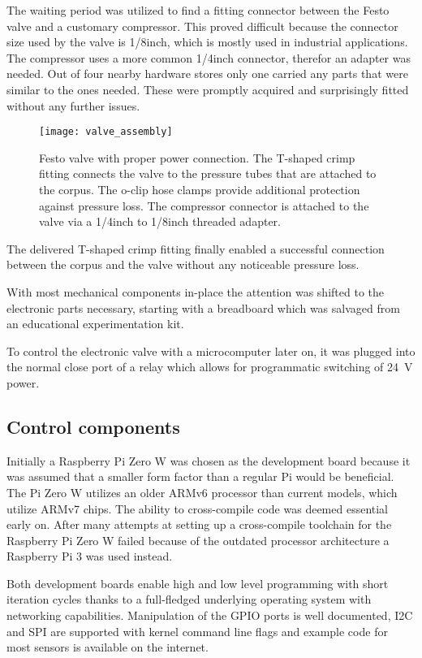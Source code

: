 The waiting period was utilized to find a fitting connector between the Festo valve and a customary compressor. This proved difficult because the connector size used by the valve is 1/8inch, which is mostly used in industrial applications. The compressor uses a more common 1/4inch connector, therefor an adapter was needed. Out of four nearby hardware stores only one carried any parts that were similar to the ones needed. These were promptly acquired and surprisingly fitted without any further issues.

\begin{figure}[h]
\centering

\texttt{[image: valve\_assembly]}

\caption{Festo valve with proper power connection. The T-shaped crimp fitting connects the valve to the pressure tubes that are attached to the corpus. The o-clip hose clamps provide additional protection against pressure loss. The compressor connector is attached to the valve via a 1/4inch to 1/8inch threaded adapter.}
\end{figure}

The delivered T-shaped crimp fitting finally enabled a successful connection between the corpus and the valve without any noticeable pressure loss.  

With most mechanical components in-place the attention was shifted to the electronic parts necessary, starting with a breadboard which was salvaged from an educational experimentation kit. 

To control the electronic valve with a microcomputer later on, it was plugged into the normal close port of a relay which allows for programmatic switching of \SI{24}{\volt} power. 

\subsection{Control components}
Initially a Raspberry Pi Zero W \cite{raspberry-pi-zero-w} was chosen as the development board because it was assumed that a smaller form factor than a regular Pi would be beneficial. 
The Pi Zero W utilizes an older ARMv6 processor than current models, which utilize ARMv7 chips. 
The ability to cross-compile code was deemed essential early on. After many attempts at setting up a cross-compile toolchain for the Raspberry Pi Zero W failed because of the outdated processor architecture a Raspberry Pi 3 \cite{raspberry-pi-3} was used instead. 

Both development boards enable high and low level programming with short iteration cycles thanks to a full-fledged underlying operating system \cite{raspbian} with networking capabilities. Manipulation of the GPIO ports is well documented, I2C and SPI are supported with kernel command line flags and example code for most sensors is available on the internet.

